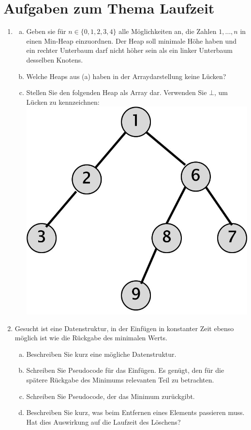 \documentclass{scrartcl}
\begin{document}
\section*{Aufgaben zum Thema Laufzeit}
\begin{enumerate}[(1)]

\item
\begin{enumerate}[(a)]
\item Geben sie f\"ur $n\in \{0,1,2,3,4\}$ alle M\"oglichkeiten an, die Zahlen $1,\dots,n$ in einen Min-Heap einzuordnen. Der Heap soll minimale H\"ohe haben und ein rechter Unterbaum darf nicht h\"oher sein als ein linker Unterbaum desselben Knotens.
\item Welche Heaps aus (a) haben in der Arraydarstellung keine L\"ucken?
\item Stellen Sie den folgenden Heap als Array dar. Verwenden Sie $\bot$, um L\"ucken zu kennzeichnen:\newline
{\center\includegraphics[scale=0.3]{Heap.jpg}}
\end{enumerate}

\item
Gesucht ist eine Datenstruktur, in der Einf\"ugen in konstanter Zeit ebenso m\"oglich ist wie die R\"uckgabe des minimalen Werts.
\begin{enumerate}[(a)]
\item Beschreiben Sie kurz eine m\"ogliche Datenstruktur.
\item Schreiben Sie Pseudocode f\"ur das Einf\"ugen. Es gen\"ugt, den f\"ur die sp\"atere R\"uckgabe des Minimums relevanten Teil zu betrachten.
\item Schreiben Sie Pseudocode, der das Minimum zur\"uckgibt.
\item Beschreiben Sie kurz, was beim Entfernen eines Elements passieren muss. Hat dies Auswirkung auf die Laufzeit des L\"oschens?
\end{enumerate}


\end{enumerate}
\end{document}
